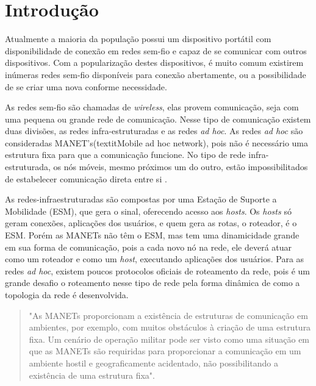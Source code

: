\section{Introdu\c{c}\~ao} 
Atualmente a maioria da popula\c{c}\~ao possui um dispositivo port\'atil com disponibilidade de conex\~ao em redes sem-fio e capaz de se comunicar com outros dispositivos. 
Com a populariza\c{c}\~ao destes dispositivos, \'e muito comum existirem in\'umeras redes sem-fio dispon\'iveis para conex\~ao abertamente, ou a possibilidade de se criar uma nova conforme necessidade.

As redes sem-fio s\~ao chamadas de \textit{wireless}, elas provem comunica\c{c}\~ao, seja com uma pequena ou grande rede de comunica\c{c}\~ao. 
Nesse tipo de comunica\c{c}\~ao existem duas divis\~oes, as redes infra-estruturadas e as redes \textit{ad hoc}. 
As redes \textit{ad hoc} s\~ao consideradas MANET's(textit{Mobile ad hoc network}), pois n\~ao \'e necess\'ario uma estrutura fixa para que a comunica\c{c}\~ao funcione.
No tipo de rede infra-estruturada, os n\'os m\'oveis, mesmo pr\'oximos um do outro, est\~ao impossibilitados de estabelecer comunica\c{c}\~ao direta entre si \cite{pereira}.

As redes-infraestruturadas s\~ao compostas por uma Esta\c{c}\~ao de Suporte a Mobilidade (ESM), que gera o sinal, oferecendo acesso aos \textit{hosts}. 
Os \textit{hosts} s\'o geram conex\~oes, aplica\c{c}\~oes dos usu\'arios, e quem gera as rotas, o roteador, \'e o ESM. 
Por\'em as MANETs n\~ao t\^em o ESM, mas tem uma dinamicidade grande em sua forma de comunica\c{c}\~ao, pois a cada novo n\'o na rede, ele dever\'a atuar como um roteador e como um \textit{host}, executando aplica\c{c}\~oes dos usu\'arios. 
Para as redes \textit{ad hoc}, existem poucos protocolos oficiais de roteamento da rede, pois \'e um grande desafio o roteamento nesse tipo de rede pela forma din\^ amica de como a topologia da rede \'e desenvolvida.

\begin{quote}
"As MANETs proporcionam a exist\^encia de estruturas de comunica\c{c}\~ao em ambientes, por exemplo, com muitos obst\'aculos \`a cria\c{c}\~ao de uma estrutura fixa. 
Um cen\'ario de opera\c{c}\~ao militar pode ser visto como uma situa\c{c}\~ao em que as MANETs s\~ao requiridas para proporcionar a comunica\c{c}\~ao em um ambiente hostil e geograficamente acidentado, n\~ao possibilitando a exist\^encia de uma estrutura fixa"\cite{schimidt}.
\end{quote}

